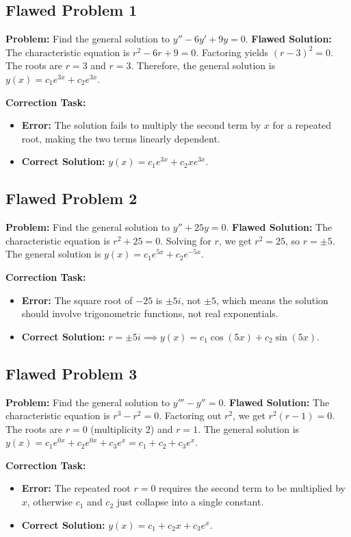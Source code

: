 \documentclass[11pt, a4paper]{article}
\theoremstyle{definition}
\theoremstyle{remark}
\begin{document}
\subsection*{Flawed Problem 1}
\textbf{Problem:} Find the general solution to $y'' - 6y' + 9y = 0$.
\textbf{Flawed Solution:}
The characteristic equation is $r^2 - 6r + 9 = 0$.
Factoring yields $(r - 3)^2 = 0$.
The roots are $r = 3$ and $r = 3$.
Therefore, the general solution is $y(x) = c_1 e^{3x} + c_2 e^{3x}$.

\textbf{Correction Task:}
\begin{itemize}
    \item \textbf{Error:} The solution fails to multiply the second term by $x$ for a repeated root, making the two terms linearly dependent.
    \item \textbf{Correct Solution:} $y(x) = c_1 e^{3x} + c_2 x e^{3x}$.
\end{itemize}

\subsection*{Flawed Problem 2}
\textbf{Problem:} Find the general solution to $y'' + 25y = 0$.
\textbf{Flawed Solution:}
The characteristic equation is $r^2 + 25 = 0$.
Solving for $r$, we get $r^2 = 25$, so $r = \pm 5$.
The general solution is $y(x) = c_1 e^{5x} + c_2 e^{-5x}$.

\textbf{Correction Task:}
\begin{itemize}
    \item \textbf{Error:} The square root of $-25$ is $\pm 5i$, not $\pm 5$, which means the solution should involve trigonometric functions, not real exponentials.
    \item \textbf{Correct Solution:} $r = \pm 5i \implies y(x) = c_1 \cos(5x) + c_2 \sin(5x)$.
\end{itemize}

\subsection*{Flawed Problem 3}
\textbf{Problem:} Find the general solution to $y''' - y'' = 0$.
\textbf{Flawed Solution:}
The characteristic equation is $r^3 - r^2 = 0$.
Factoring out $r^2$, we get $r^2(r - 1) = 0$.
The roots are $r = 0$ (multiplicity 2) and $r = 1$.
The general solution is $y(x) = c_1 e^{0x} + c_2 e^{0x} + c_3 e^x = c_1 + c_2 + c_3 e^x$.

\textbf{Correction Task:}
\begin{itemize}
    \item \textbf{Error:} The repeated root $r=0$ requires the second term to be multiplied by $x$, otherwise $c_1$ and $c_2$ just collapse into a single constant.
    \item \textbf{Correct Solution:} $y(x) = c_1 + c_2 x + c_3 e^x$.
\end{itemize}
\end{document}
